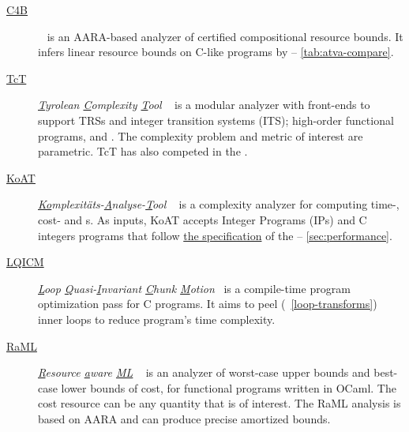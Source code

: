 \begin{description}
\item[\href{https://github.com/academic-archive/pldi15}{C4B}]
      ~\cite{carbonneaux2015}
      is an AARA-based analyzer of certified compositional resource bounds. It
      infers linear resource bounds on C-like programs by  --
      \autoref{tab:atva-compare}.

\item[\href{http://cl-informatik.uibk.ac.at/software/tct/}{TcT}]
       \emph{\underline{T}yrolean \underline{C}omplexity \underline{T}ool}
       ~\cite{avanzini2016}
       is a modular analyzer with front-ends to support TRSs and integer
       transition systems (ITS); high-order functional programs, and . The complexity problem and metric of interest are parametric.
       TcT has also competed in the .

\item[\href{https://koat.verify.rwth-aachen.de/cfr_mprf}{KoAT}]
       \emph{\underline{Ko}mplexitäts-\underline{A}nalyse-\underline{T}ool}
       ~\cite{brockschmidt2016}
       is a complexity analyzer for computing time-, cost- and s. As inputs, KoAT accepts Integer Programs (IPs) and C integers programs that follow
       \href{https://termination-portal.org/wiki/C_Integer_Programs}{the
        specification} of the  --
       \autoref{sec:performance}.

\item[\href{https://github.com/statycc/LQICM_On_C_Toy_Parser}{LQICM}]
      \emph{\underline{L}oop \underline{Q}uasi-\underline{I}nvariant
      \underline{C}hunk \underline{M}otion}~\cite{moyen20172} is a
      compile-time program optimization pass for C programs. It aims to peel
      (\cf~\autoref{loop-transforms}) inner loops to reduce program's time
      complexity.

\item[\href{https://www.raml.co/about}{RaML}]
       \emph{\underline{R}esource \underline{a}ware \underline{ML}}
       ~\cite{hoffmann2017}
       is an analyzer of worst-case upper bounds and best-case lower bounds of
       cost, for functional programs written in OCaml. The cost
       resource can be any quantity that is of interest. The RaML analysis is
       based on AARA and can produce precise amortized
       bounds.


\end{description}
